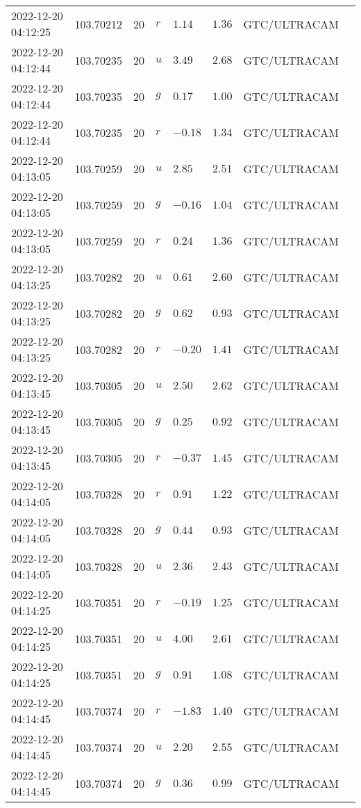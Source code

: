 \documentclass{nature_plusfigure}
\begin{document}
\begin{supplement}
\begin{center}
\begin{longtable}{llllllll}
2022-12-20 04:12:25 & 103.70212 & 20 & $r$ & $1.14$ & $1.36$ & GTC/ULTRACAM &  \\ 
2022-12-20 04:12:44 & 103.70235 & 20 & $u$ & $3.49$ & $2.68$ & GTC/ULTRACAM &  \\ 
2022-12-20 04:12:44 & 103.70235 & 20 & $g$ & $0.17$ & $1.00$ & GTC/ULTRACAM &  \\ 
2022-12-20 04:12:44 & 103.70235 & 20 & $r$ & $-0.18$ & $1.34$ & GTC/ULTRACAM &  \\ 
2022-12-20 04:13:05 & 103.70259 & 20 & $u$ & $2.85$ & $2.51$ & GTC/ULTRACAM &  \\ 
2022-12-20 04:13:05 & 103.70259 & 20 & $g$ & $-0.16$ & $1.04$ & GTC/ULTRACAM &  \\ 
2022-12-20 04:13:05 & 103.70259 & 20 & $r$ & $0.24$ & $1.36$ & GTC/ULTRACAM &  \\ 
2022-12-20 04:13:25 & 103.70282 & 20 & $u$ & $0.61$ & $2.60$ & GTC/ULTRACAM &  \\ 
2022-12-20 04:13:25 & 103.70282 & 20 & $g$ & $0.62$ & $0.93$ & GTC/ULTRACAM &  \\ 
2022-12-20 04:13:25 & 103.70282 & 20 & $r$ & $-0.20$ & $1.41$ & GTC/ULTRACAM &  \\ 
2022-12-20 04:13:45 & 103.70305 & 20 & $u$ & $2.50$ & $2.62$ & GTC/ULTRACAM &  \\ 
2022-12-20 04:13:45 & 103.70305 & 20 & $g$ & $0.25$ & $0.92$ & GTC/ULTRACAM &  \\ 
2022-12-20 04:13:45 & 103.70305 & 20 & $r$ & $-0.37$ & $1.45$ & GTC/ULTRACAM &  \\ 
2022-12-20 04:14:05 & 103.70328 & 20 & $r$ & $0.91$ & $1.22$ & GTC/ULTRACAM &  \\ 
2022-12-20 04:14:05 & 103.70328 & 20 & $g$ & $0.44$ & $0.93$ & GTC/ULTRACAM &  \\ 
2022-12-20 04:14:05 & 103.70328 & 20 & $u$ & $2.36$ & $2.43$ & GTC/ULTRACAM &  \\ 
2022-12-20 04:14:25 & 103.70351 & 20 & $r$ & $-0.19$ & $1.25$ & GTC/ULTRACAM &  \\ 
2022-12-20 04:14:25 & 103.70351 & 20 & $u$ & $4.00$ & $2.61$ & GTC/ULTRACAM &  \\ 
2022-12-20 04:14:25 & 103.70351 & 20 & $g$ & $0.91$ & $1.08$ & GTC/ULTRACAM &  \\ 
2022-12-20 04:14:45 & 103.70374 & 20 & $r$ & $-1.83$ & $1.40$ & GTC/ULTRACAM &  \\ 
2022-12-20 04:14:45 & 103.70374 & 20 & $u$ & $2.20$ & $2.55$ & GTC/ULTRACAM &  \\ 
2022-12-20 04:14:45 & 103.70374 & 20 & $g$ & $0.36$ & $0.99$ & GTC/ULTRACAM &  \\ 

\end{longtable}
\end{center}
\end{supplement}
\end{document}
